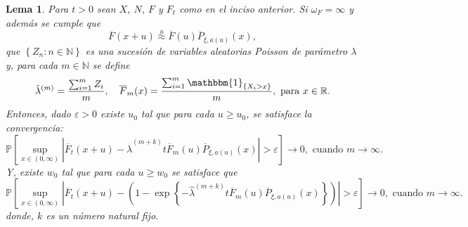 \documentclass[10.5pt,notitlepage]{article}
\newcommand{\PP}{\mathbb{P}}
\newcommand{\RR}{\mathbb{R}}
\newcommand{\ee}{\varepsilon}
\newcommand{\NN}{\mathbb{N}}
\newcommand{\approxu}{\overset{u}{\approx}}
\newcommand{\abs}[1]{\left\lvert #1 \right\rvert}
\newcommand{\corch}[1]{\left[ #1 \right]}
\newcommand{\kis}[1]{\left\{ #1 \right\}}
\newcommand{\pare}[1]{\left( #1 \right)}
\theoremstyle{plain}
\newtheorem{lem}[thm]{Lema} %
\begin{document}
\begin{lem}\label{lem.2}
Para \(t > 0\) sean \(X\), \(N\), \(F\) y \(F_{t}\) como en el inciso anterior. Si \(\omega_{F} = \infty\) y además se cumple que   
\[
\overline{F}(x + u) \approxu \overline{F}(u)\overline{P}_{\xi,a(u)}(x),
\]
que \(\kis{Z_n : n \in \NN}\) es una sucesión de variables aleatorias Poisson de parámetro \(\lambda\) y, para cada \(m \in \NN\) se define 
\begin{equation}
    \hat{\lambda}^{(m)} = \frac{\sum_{i = 1}^{m}Z_{i}}{m}, \quad \overline{F}_{m}(x) = \frac{\sum_{i = 1}^{m}\mathbbm{1}_{\kis{X_{i} > x}}}{m}, \text{ para } x \in \RR.
\end{equation}
Entonces, dado \(\ee > 0\) existe \(u_0\) tal que para cada \(u \geq u_0\), se satisface la convergencia:
 \[
\PP\corch{ \sup_{x \in (0, \infty)}\abs{\overline{F}_{t}(x + u) -  \hat{\lambda}^{(m + k)} t \overline{F}_{m}(u)\overline{P}_{\xi,a(u)}(x)} > \ee}\to 0, \text{ cuando } m \to \infty.
\]
Y, existe \(w_0\) tal que para cada \(u \geq w_0\) se satisface que 
 \[
\PP\corch{ \sup_{x \in (0, \infty)}\abs{\overline{F}_{t}(x + u) - \pare{1-\exp\kis{- \hat{\lambda}^{(m + k)} t \overline{F}_{m}(u)\overline{P}_{\xi,a(u)}(x)}}} > \ee}\to 0, \text{ cuando } m \to \infty.
\]
donde, \(k\) es un número natural fijo.
\end{lem}
\end{document}
